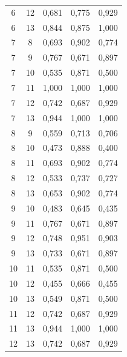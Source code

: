 \documentclass[12pt,a4paper,oneside]{report}
\begin{document}
\begin{longtable}{ccccc}
6 & 12 & 0,681 & 0,775 & 0,929 \\
6 & 13 & 0,844 & 0,875 & 1,000 \\
7 & 8 & 0,693 & 0,902 & 0,774 \\
7 & 9 & 0,767 & 0,671 & 0,897 \\
7 & 10 & 0,535 & 0,871 & 0,500 \\
7 & 11 & 1,000 & 1,000 & 1,000 \\
7 & 12 & 0,742 & 0,687 & 0,929 \\
7 & 13 & 0,944 & 1,000 & 1,000 \\
8 & 9 & 0,559 & 0,713 & 0,706 \\
8 & 10 & 0,473 & 0,888 & 0,400 \\
8 & 11 & 0,693 & 0,902 & 0,774 \\
8 & 12 & 0,533 & 0,737 & 0,727 \\
8 & 13 & 0,653 & 0,902 & 0,774 \\
9 & 10 & 0,483 & 0,645 & 0,435 \\
9 & 11 & 0,767 & 0,671 & 0,897 \\
9 & 12 & 0,748 & 0,951 & 0,903 \\
9 & 13 & 0,733 & 0,671 & 0,897 \\
10 & 11 & 0,535 & 0,871 & 0,500 \\
10 & 12 & 0,455 & 0,666 & 0,455 \\
10 & 13 & 0,549 & 0,871 & 0,500 \\
11 & 12 & 0,742 & 0,687 & 0,929 \\
11 & 13 & 0,944 & 1,000 & 1,000 \\
12 & 13 & 0,742 & 0,687 & 0,929 \\
\end{longtable}
\endgroup
\end{document}
